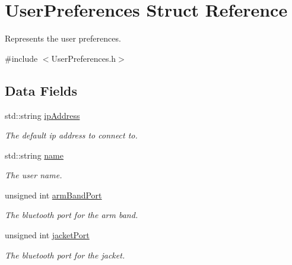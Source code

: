 \hypertarget{structUserPreferences}{
\section{UserPreferences Struct Reference}
\label{structUserPreferences}
}


Represents the user preferences.  




{\ttfamily \#include $<$UserPreferences.h$>$}

\subsection*{Data Fields}
\begin{DoxyCompactItemize}
\item 
\hypertarget{structUserPreferences_a2b7225f2ddf069be9e4f23f426409020}{
std::string \hyperlink{structUserPreferences_a2b7225f2ddf069be9e4f23f426409020}{ipAddress}}
\label{structUserPreferences_a2b7225f2ddf069be9e4f23f426409020}

\begin{DoxyCompactList}\small\item\em The default ip address to connect to. \item\end{DoxyCompactList}\item 
\hypertarget{structUserPreferences_a38d4e509e3d15d642d5e9517ddffd77e}{
std::string \hyperlink{structUserPreferences_a38d4e509e3d15d642d5e9517ddffd77e}{name}}
\label{structUserPreferences_a38d4e509e3d15d642d5e9517ddffd77e}

\begin{DoxyCompactList}\small\item\em The user name. \item\end{DoxyCompactList}\item 
\hypertarget{structUserPreferences_ac8d206952bf8799e05dbd99ec4bc4a33}{
unsigned int \hyperlink{structUserPreferences_ac8d206952bf8799e05dbd99ec4bc4a33}{armBandPort}}
\label{structUserPreferences_ac8d206952bf8799e05dbd99ec4bc4a33}

\begin{DoxyCompactList}\small\item\em The bluetooth port for the arm band. \item\end{DoxyCompactList}\item 
\hypertarget{structUserPreferences_ad4bc7a7d5215b907953d7a0877dd2dec}{
unsigned int \hyperlink{structUserPreferences_ad4bc7a7d5215b907953d7a0877dd2dec}{jacketPort}}
\label{structUserPreferences_ad4bc7a7d5215b907953d7a0877dd2dec}

\begin{DoxyCompactList}\small\item\em The bluetooth port for the jacket. \item\end{DoxyCompactList}\end{DoxyCompactItemize}
